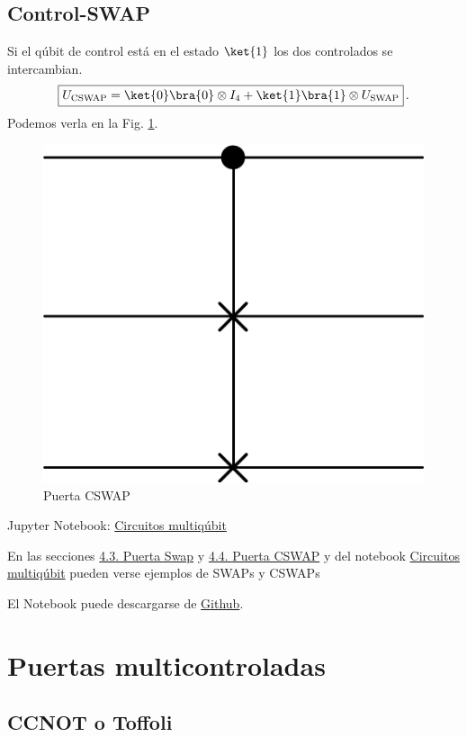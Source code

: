 \documentclass[a4paper,11pt]{book} %
\numberwithin{equation}{chapter}
\begin{document}
        \subsection{Control-SWAP}

Si el qúbit  de control está en  el estado $\ket{1}$ los dos controlados se intercambian. 
	\begin{equation} \label{Fig_multiqubit_CSWAP_gate}
	\boxed{U_{\rm CSWAP} =\ket{0}\bra{0} \otimes I_4 + \ket{1}\bra{1} \otimes U_{\rm SWAP}} \, .
	\end{equation}
Podemos verla en la Fig. \ref{Fig_multiqubit_CSWAP_gate}. 
	\begin{figure}[H]
	\centering 
	\includegraphics[width=0.13\linewidth]{Figuras/Fig_multiqubit_CSWAP_gate.png}
	\caption{Puerta CSWAP}
	\label{Fig_multiqubit_CSWAP_gate}
	\end{figure}

		\begin{mybox_orange}{Jupyter Notebook: \href{https://www.scbi.uma.es/web/wp-content/uploads/Jupyterbook/CICC_UMA/Notebooks/html/docs/Part_01/Chapter_04-Circuitos_Multiqubits_myst.html}{Circuitos multiqúbit}}
	
	
	En las secciones \href{https://www.scbi.uma.es/web/wp-content/uploads/Jupyterbook/CICC_UMA/Notebooks/html/docs/Part_01/Chapter_04-Circuitos_Multiqubits_myst.html#puerta-swap}{4.3. Puerta Swap} y  \href{https://www.scbi.uma.es/web/wp-content/uploads/Jupyterbook/CICC_UMA/Notebooks/html/docs/Part_01/Chapter_04-Circuitos_Multiqubits_myst.html#puerta-cswap}{4.4. Puerta CSWAP} y  del notebook \href{https://www.scbi.uma.es/web/wp-content/uploads/Jupyterbook/CICC_UMA/Notebooks/html/docs/Part_01/Chapter_04-Circuitos_Multiqubits_myst.html}{Circuitos multiqúbit} pueden verse ejemplos de SWAPs y CSWAPs
	
	El Notebook puede descargarse de \href{https://github.com/davidcb98/CICC_UMA/blob/master/Notebooks/Part_01/Chapter_04-Circuitos_Multiqubits.ipynb}{Github}.
	\end{mybox_orange}

    \section{Puertas multicontroladas}
		\subsection{CCNOT o Toffoli}
		
\end{document}
